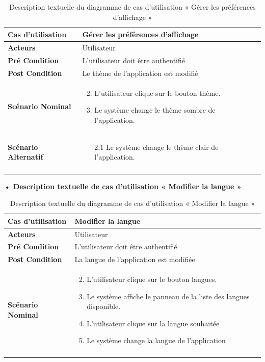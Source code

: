 \begin{longtable}{|p{5cm}|p{10cm}|}
\hline
\textbf{Cas d'utilisation}&Gérer les préférences d'affichage \\
\hline
\textbf{Acteurs}&Utilisateur\\
\hline
\textbf{Pré Condition}&L'utilisateur doit être authentifié\\
\hline
\textbf{Post Condition}&Le thème de l'application est modifié \\
\hline
\textbf{Scénario Nominal}&
\vspace{-\baselineskip}
\begin{enumerate}
  \setcounter{enumi}{1}
 \item L'utilisateur clique sur le bouton thème.
 \item Le système change le thème sombre de l'application.
\end{enumerate}\\
\hline
\textbf{Scénario Alternatif}&
\vspace{-\baselineskip}
\begin{enumerate}
 \item [2.1] Le système change le thème clair de l'application.
\end{enumerate}\\
\hline
\caption{Description textuelle du diagramme de cas d'utilisation « Gérer les préférences d'affichage  »}
\label{tab:use_case_manage_display_preferences}
\end{longtable}

\textbf{•	Description textuelle de cas d'utilisation « Modifier la langue »}

\begin{longtable}{|p{5cm}|p{10cm}|}
\hline
\textbf{Cas d'utilisation}&Modifier la langue \\
\hline
\textbf{Acteurs}&Utilisateur\\
\hline
\textbf{Pré Condition}&L'utilisateur doit être authentifié\\
\hline
\textbf{Post Condition}&La langue de l'application est modifiée \\
\hline
\textbf{Scénario Nominal}&
\vspace{-\baselineskip}
\begin{enumerate}
  \setcounter{enumi}{1}
  \item L'utilisateur clique sur le bouton langues.
  \item Le système affiche le panneau de la liste des langues disponible.
  \item L'utilisateur clique sur la langue souhaitée 
  \item Le système change la langue de l'application
\end{enumerate}\\
\hline
\caption{Description textuelle du diagramme de cas d'utilisation « Modifier la langue  »}
\label{tab:use_case_change_language}
\end{longtable}


